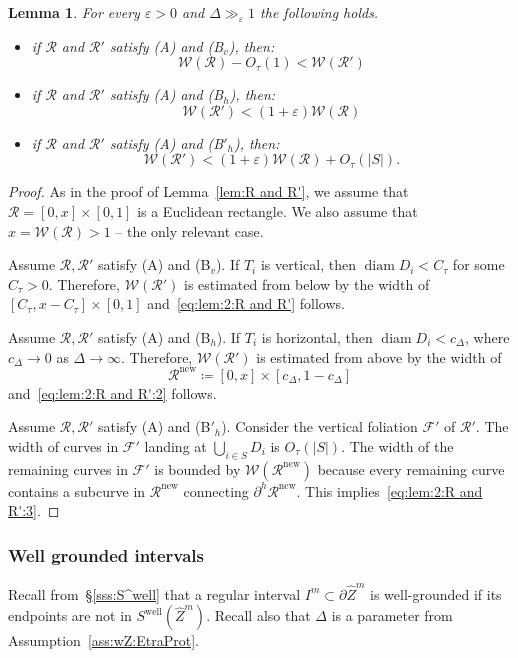 \documentclass{amsart}
\newcommand{\1}{{\mathbb 1 }}
\newcommand{\Fam}{{\mathcal F}}
\newcommand{\Width}{{\mathcal W}}
\newcommand{\bDelta}{{\mathbb{\Delta}}}
\newcommand\RR{\mathcal{R}}
\newcommand{\wZ}{{\widehat Z}}
\newcommand{\well}{{\operatorname{well}}}
\newcommand\new{{\operatorname{new}}}
\newtheorem{lem}[thm]{Lemma}
\theoremstyle{remark}
\numberwithin{equation}{section}
\theoremstyle{definition}
\newcommand{\diam}{\operatorname{diam}}
\begin{document}
\begin{lem}
\label{lem:2:R and R'}
For every $\varepsilon>0$ and $\Delta \gg_\varepsilon 1$ the following holds. 
\begin{itemize}
\item if $\RR$ and $\RR'$ satisfy (A) and (B${}_{v}$), then:
 \begin{equation}
\label{eq:lem:2:R and R'}
 \Width(\RR) - O_\tau(1) < \Width(\RR')
 \end{equation}
\item if $\RR$ and $\RR'$ satisfy (A) and (B${}_{h}$), then:
 \begin{equation}
\label{eq:lem:2:R and R':2}
  \Width(\RR')< (1+\varepsilon)\Width(\RR) 
 \end{equation}
 \item if $\RR$ and $\RR'$ satisfy (A) and (B$'{}_{h}$), then:
 \begin{equation}
\label{eq:lem:2:R and R':3}
  \Width(\RR')< (1+\varepsilon)\Width(\RR) +O_\tau(|S|).
 \end{equation}
\end{itemize}
\end{lem}
\begin{proof}
As in the proof of Lemma~\ref{lem:R and R'}, we assume that $\RR=[0,x]\times [0,1]$ is a Euclidean rectangle. We also assume that $x=\Width(\RR)>1$ -- the only relevant case.

Assume $\RR,\RR'$ satisfy (A) and (B${}_{v}$). If $T_i$ is vertical, then $\diam D_i <C_\tau$ for some $C_\tau>0$. Therefore, $\Width(\RR')$ is estimated from below by the width of $[C_\tau, x-C_\tau]\times[0,1]$ and~\eqref{eq:lem:2:R and R'} follows. 


Assume $\RR,\RR'$ satisfy (A) and (B${}_{h}$). If $T_i$ is horizontal, then $\diam D_i <c_\Delta$, where $c_\Delta\to 0$ as $\Delta \to \infty$. Therefore, $\Width(\RR')$ is estimated from above by the width of \[\RR^\new\coloneqq [0,x]\times[c_\Delta, 1-c_\Delta]\] and~\eqref{eq:lem:2:R and R':2} follows. 

Assume $\RR,\RR'$ satisfy (A) and (B$'{}_{h}$). Consider the vertical foliation $\Fam'$ of $\RR'$. The width of curves in $\Fam'$ landing at $\bigcup_{i\in S}D_i$ is $O_\tau(|S|)$. The width of the remaining curves in $\Fam'$ is bounded by $\Width(\RR^\new)$ because every remaining curve contains a subcurve in $\RR^\new$  connecting $\partial ^h\RR^\new$. This implies~\eqref{eq:lem:2:R and R':3}.
\end{proof}


\subsubsection{Well grounded intervals} Recall from~\S\ref{sss:S^well} that  a regular interval $I^m\subset \partial \wZ^m$ is well-grounded if its endpoints are not in $S^\well (\wZ^m)$.  Recall also that $\bDelta$ is a parameter from Assumption~\ref{ass:wZ:EtraProt}.
\end{document}
